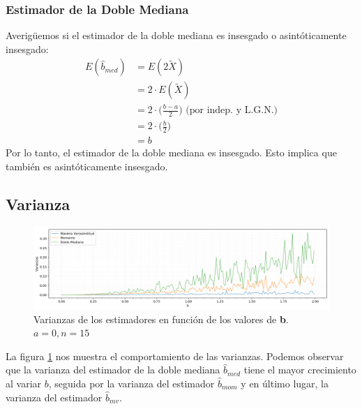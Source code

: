 \subsubsection{Estimador de la Doble Mediana}
Averigüemos si el estimador de la doble mediana es insesgado o asintóticamente insesgado:
\begin{align*}
	E(\hat{b}_{med}) &= E(2\tilde{X}) \\
	 	 			 &= 2 \cdot E(\tilde{X}) \\
	 	 			 &= 2 \cdot \Big(\frac{b - a}{2}\Big) \text{ (por indep. y L.G.N.)}\\
	 	 			 &= 2 \cdot \Big(\frac{b}{2}\Big) \\
	 	 			 &= b
\end{align*}
Por lo tanto, el estimador de la doble mediana es insesgado. Esto implica que también es asintóticamente insesgado.

\subsection{Varianza}
\begin{figure}[H]
	\centering
	\includegraphics[width=1\textwidth]{imagenes/varianzas.png}
	\caption{\footnotesize Varianzas de los estimadores en función de los valores de \textbf{b}. $a=0, n=15$}
	\label{fig:ej6-varianzas}
\end{figure}

La figura \ref{fig:ej6-varianzas} nos muestra el comportamiento de las varianzas. Podemos observar que la varianza del estimador de la doble mediana $\hat{b}_{med}$ tiene el mayor crecimiento al variar $b$, seguida por la varianza del estimador $\hat{b}_{mom}$ y en último lugar, la varianza del estimador $\hat{b}_{mv}$.


